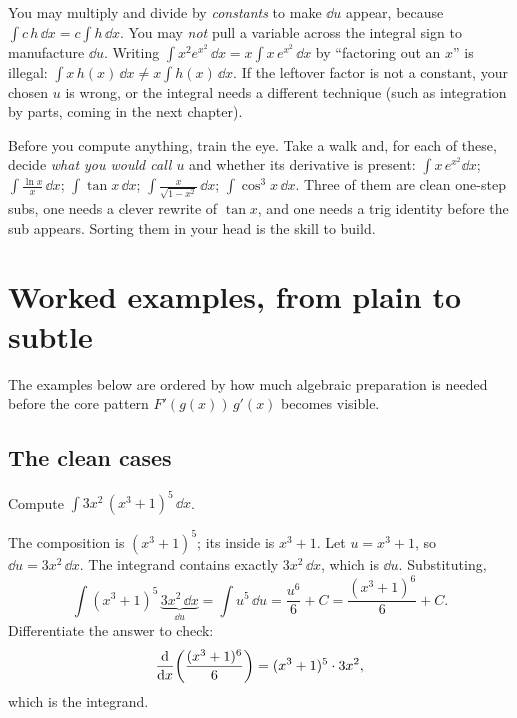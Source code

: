 \begin{trapbox}
You may multiply and divide by \emph{constants} to make $\dd u$ appear, because
$\int c\,h\,\dd x = c\int h\,\dd x$. You may \emph{not} pull a variable across the
integral sign to manufacture $\dd u$. Writing $\int x^2 e^{x^2}\,\dd x = x\int
x\,e^{x^2}\,\dd x$ by ``factoring out an $x$'' is illegal: $\int x\,h(x)\,\dd x \ne x\int
h(x)\,\dd x$. If the leftover factor is not a constant, your chosen $u$ is wrong, or
the integral needs a different technique (such as integration by parts, coming in
the next chapter).
\end{trapbox}

\begin{walkbox}
Before you compute anything, train the eye. Take a walk and, for each of these,
decide \emph{what you would call $u$} and whether its derivative is present:
$\int x\,e^{x^2}\dd x$; $\int \frac{\ln x}{x}\,\dd x$; $\int \tan x\,\dd x$;
$\int \frac{x}{\sqrt{1-x^2}}\,\dd x$; $\int \cos^3 x\,\dd x$. Three of them are
clean one-step subs, one needs a clever rewrite of $\tan x$, and one needs a trig
identity before the sub appears. Sorting them in your head is the skill to build.
\end{walkbox}

\section{Worked examples, from plain to subtle}
\label{ch22:examples}

The examples below are ordered by how much algebraic preparation is needed before
the core pattern $F'(g(x))\,g'(x)$ becomes visible.

\subsection{The clean cases}

\begin{example}
\label{ch22:ex-clean1}
Compute $\displaystyle \int 3x^2\,(x^3+1)^5\,\dd x$.

The composition is $(x^3+1)^5$; its inside is $x^3+1$. Let $u = x^3+1$, so
$\dd u = 3x^2\,\dd x$. The integrand contains exactly $3x^2\,\dd x$, which is $\dd
u$. Substituting,
\[
  \int (x^3+1)^5\,\underbrace{3x^2\,\dd x}_{\dd u}
   = \int u^5\,\dd u = \frac{u^6}{6} + C = \frac{(x^3+1)^6}{6} + C.
\]
Differentiate the answer to check:
\[
  \frac{\mathrm{d}}{\mathrm{d} x}\!\left(\frac{(x^3+1)^6}{6}\right) = (x^3+1)^5\cdot 3x^2,
\]
which is the integrand.
\end{example}

